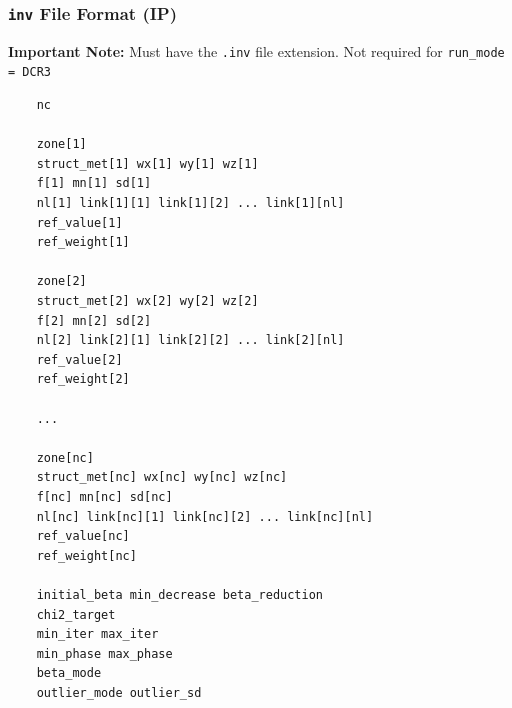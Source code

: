 \documentclass[a4paper,12pt]{article}
\begin{document}
\newpage
\subsubsection{\texttt{inv} File Format (IP)} \label{inversion_ip}

\begin{framed}
\noindent \textbf{Important Note:} Must have the \texttt{.inv} file extension. Not required for \texttt{run\_mode = DCR3}
\end{framed}

\begin{framed}
\begin{verbatim}
    nc

    zone[1]
    struct_met[1] wx[1] wy[1] wz[1]
    f[1] mn[1] sd[1]
    nl[1] link[1][1] link[1][2] ... link[1][nl]
    ref_value[1]
    ref_weight[1]

    zone[2]
    struct_met[2] wx[2] wy[2] wz[2]
    f[2] mn[2] sd[2]
    nl[2] link[2][1] link[2][2] ... link[2][nl]
    ref_value[2]
    ref_weight[2]

    ...

    zone[nc]
    struct_met[nc] wx[nc] wy[nc] wz[nc]
    f[nc] mn[nc] sd[nc]
    nl[nc] link[nc][1] link[nc][2] ... link[nc][nl]
    ref_value[nc]
    ref_weight[nc]

    initial_beta min_decrease beta_reduction
    chi2_target
    min_iter max_iter
    min_phase max_phase
    beta_mode
    outlier_mode outlier_sd
\end{verbatim}
\end{framed}
\end{document}
